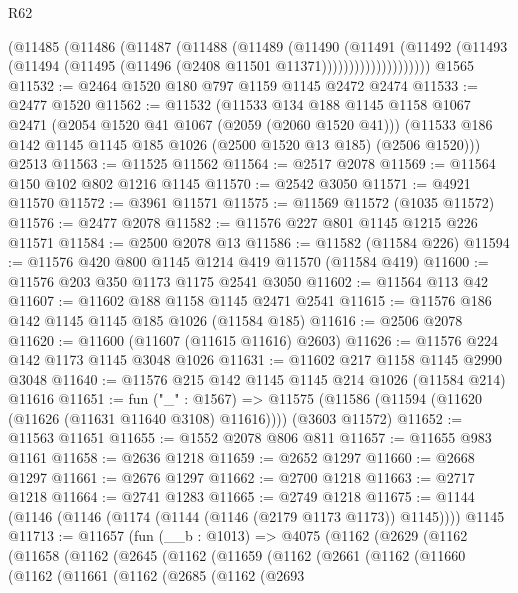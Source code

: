 \begin{lexlean}{R62}
\begin{coremodule}
                  (@11485
                    (@11486
                      (@11487
                        (@11488
                          (@11489
                            (@11490
                              (@11491
                                (@11492
                                  (@11493
                                    (@11494 (@11495 (@11496 (@2408 @11501 @11371))))))))))))))))))))
    @1565
@11532 := @2464 @1520 @180 @797 @1159 @1145 @2472 @2474
@11533 := @2477 @1520
@11562 := @11532
    (@11533
      @134
      @188
      @1145
      @1158
      @1067
      @2471
      (@2054 @1520 @41 @1067 (@2059 (@2060 @1520 @41)))
      (@11533 @186 @142 @1145 @1145 @185 @1026 (@2500 @1520 @13 @185) (@2506 @1520)))
    @2513
@11563 := @11525 @11562
@11564 := @2517 @2078
@11569 := @11564 @150 @102 @802 @1216 @1145
@11570 := @2542 @3050
@11571 := @4921 @11570
@11572 := @3961 @11571
@11575 := @11569 @11572 (@1035 @11572)
@11576 := @2477 @2078
@11582 := @11576 @227 @801 @1145 @1215 @226 @11571
@11584 := @2500 @2078 @13
@11586 := @11582 (@11584 @226)
@11594 := @11576 @420 @800 @1145 @1214 @419 @11570 (@11584 @419)
@11600 := @11576 @203 @350 @1173 @1175 @2541 @3050
@11602 := @11564 @113 @42
@11607 := @11602 @188 @1158 @1145 @2471 @2541
@11615 := @11576 @186 @142 @1145 @1145 @185 @1026 (@11584 @185)
@11616 := @2506 @2078
@11620 := @11600 (@11607 (@11615 @11616) @2603)
@11626 := @11576 @224 @142 @1173 @1145 @3048 @1026
@11631 := @11602 @217 @1158 @1145 @2990 @3048
@11640 := @11576 @215 @142 @1145 @1145 @214 @1026 (@11584 @214) @11616
@11651 := fun ("_" : @1567) =>
  @11575 (@11586 (@11594 (@11620 (@11626 (@11631 @11640 @3108) @11616)))) (@3603 @11572)
@11652 := @11563 @11651
@11655 := @1552 @2078 @806 @811
@11657 := @11655 @983 @1161
@11658 := @2636 @1218
@11659 := @2652 @1297
@11660 := @2668 @1297
@11661 := @2676 @1297
@11662 := @2700 @1218
@11663 := @2717 @1218
@11664 := @2741 @1283
@11665 := @2749 @1218
@11675 := @1144 (@1146 (@1146 (@1174 (@1144 (@1146 (@2179 @1173 @1173)) @1145)))) @1145
@11713 := @11657
    (fun (__b : @1013) =>
    @4075
      (@1162
        (@2629
          (@1162
            (@11658
              (@1162
                (@2645
                  (@1162
                    (@11659
                      (@1162
                        (@2661
                          (@1162
                            (@11660
                              (@1162
                                (@11661
                                  (@1162
                                    (@2685
                                      (@1162
                                        (@2693

\end{coremodule}
\end{lexlean}
